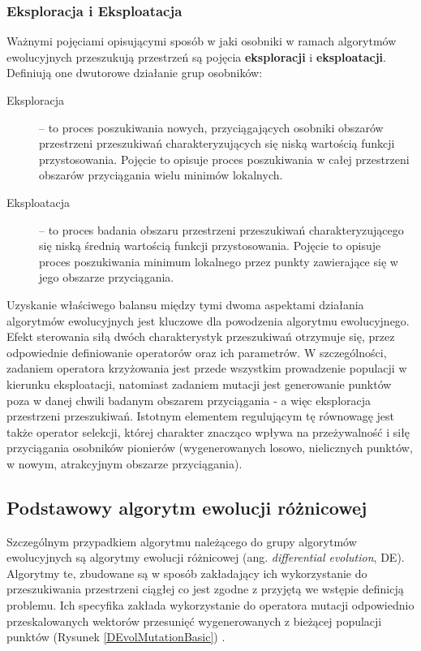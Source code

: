 \documentclass[12pt,a4paper]{report}
\begin{document}
{{\subsubsection{Eksploracja i Eksploatacja}
\par{
Ważnymi pojęciami opisującymi sposób w jaki osobniki w ramach algorytmów ewolucyjnych przeszukują przestrzeń są pojęcia \textbf{eksploracji} i \textbf{eksploatacji}. Definiują one dwutorowe działanie grup osobników:
\begin{description}
  \item[Eksploracja] -- to proces poszukiwania nowych, przyciągających osobniki obszarów przestrzeni przeszukiwań charakteryzujących się niską wartością funkcji przystosowania. Pojęcie to opisuje proces poszukiwania w całej przestrzeni obszarów przyciągania wielu minimów lokalnych. 
  \item[Eksploatacja] -- to proces badania obszaru przestrzeni przeszukiwań charakteryzującego się niską średnią wartością funkcji przystosowania. Pojęcie to opisuje proces poszukiwania minimum lokalnego przez punkty zawierające się w jego obszarze przyciągania.
\end{description}
}
\par{
Uzyskanie właściwego balansu między tymi dwoma aspektami działania algorytmów ewolucyjnych jest kluczowe dla powodzenia algorytmu ewolucyjnego. Efekt sterowania siłą dwóch charakterystyk przeszukiwań otrzymuje się, przez odpowiednie definiowanie operatorów oraz ich parametrów. W szczególności, zadaniem operatora krzyżowania jest przede wszystkim prowadzenie populacji w kierunku eksploatacji, natomiast zadaniem mutacji jest generowanie punktów poza w danej chwili badanym obszarem przyciągania - a więc eksploracja przestrzeni przeszukiwań. Istotnym elementem regulującym tę równowagę jest także operator selekcji, której charakter znacząco wpływa na przeżywalność i siłę przyciągania osobników pionierów (wygenerowanych losowo, nielicznych punktów, w nowym, atrakcyjnym obszarze przyciągania).
}

\subsection{Podstawowy algorytm ewolucji różnicowej}
\label{DEvol_section}
\par{
Szczególnym przypadkiem algorytmu należącego do grupy algorytmów ewolucyjnych są algorytmy ewolucji różnicowej (ang.\emph{ differential evolution}, DE). Algorytmy te, zbudowane są w sposób zakładający ich wykorzystanie do przeszukiwania przestrzeni ciągłej co jest zgodne z przyjętą we wstępie definicją problemu. Ich specyfika zakłada wykorzystanie do operatora mutacji odpowiednio przeskalowanych wektorów przesunięć wygenerowanych z bieżącej populacji punktów (Rysunek \ref{DEvolMutationBasic}) \cite{SpringerIntroToEvol}.
}

}}
\end{document}
